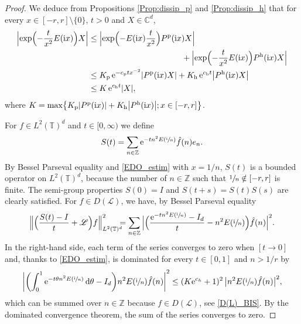 \documentclass[10pt]{amsart}
\let\mathcal\mathscr
\theoremstyle{plain}
\theoremstyle{definition}
\theoremstyle{remark}
\newcommand{\diff}[1][-3]{\ensuremath{\mathop{}\mkern#1mu\mathrm{d}}}
\newcommand{\set}{\mathbb}
\newcommand{\Z}{\set{Z}}
\renewcommand{\C}{\set{C}}
\newcommand{\T}{\set{T}}
\newcommand{\h}{{\mathrm h}}
\newcommand{\p}{{\mathrm p}}
\newcommand{\eu}{\mathrm e}
\newcommand{\iu}{\mathrm i}
\let\originalleft\left
\let\originalright\right
\renewcommand{\left}{\mathopen{}\mathclose\bgroup\originalleft}
\renewcommand{\right}{\aftergroup\egroup\originalright}
\begin{document}
\begin{proof}
We deduce from Propositions \ref{Prop:dissip_p} and \ref{Prop:dissip_h} that for every $x \in [-r,r]\setminus\{0\}$, $t> 0$ and $X \in \C^d$,
\begin{equation} \label{EDO_estim}
\begin{aligned}
\Bigl\lvert \exp\Bigl(-\frac{t}{x^2} E(\iu x) \Bigr) X \Bigl\rvert
& \leq
\Bigl\lvert \exp\Bigl(- E(\iu x) \frac{t}{x^2} \Bigr) P^\p(\iu x) X \Bigr\rvert\\
&\hspace*{4cm} +
\Bigl\lvert \exp\Bigl(- \frac{t}{x^2} E(\iu x) \Bigr) P^\h(\iu x) X \Bigr\rvert
\\ & \leq
K_\p\, \eu^{-c_\p tx^{-2}} \left\lvert P^\p(\iu x) X \right\rvert
+
K_\h\, \eu^{c_\h t} \left\lvert P^\h(\iu x) X \right\rvert
\\ & \leq
K\, \eu^{c_\h t} \left\lvert X \right\rvert,
\end{aligned}
\end{equation}
where $K=\max\left\{ K_\p \left\lvert P^\p(\iu x) \right\rvert
+ K_\h \left\lvert P^\h(\iu x) \right\rvert ; x \in [-r,r] \right\}$.

For $f \in L^2(\T)^d$ and $t\in[0,\infty)$ we define
\[
S(t)=\sum_{n\in\Z} \eu^{-tn^2 E\left(\sfrac{\iu}{n} \right)} \hat{f}(n) e_n.
\]
By Bessel Parseval equality and \eqref{EDO_estim} with $x=1/n$, $S(t)$ is a bounded operator on $L^2(\T)^d$, because the number of $n\in\Z$ such that $\sfrac{1}{n} \notin [-r,r]$ is finite.
The semi-group properties $S(0)=I$ and $S(t+s)=S(t) S(s)$ are clearly satisfied. For $f\in D(\mathcal{L})$, we have, by Bessel Parseval equality
\[
\Bigl\lVert \Bigl(\frac{S(t)-I}{t} + \mathcal{L} \Bigr)f \Bigr\rVert_{L^2(\T)^d}^2\mkern-12mu
=
\sum_{n\in\Z}\, \Bigl\lvert \Bigl(\dfrac{\eu^{-tn^2 E\left(\sfrac{\iu}{n} \right)}-I_d}{t} - n^2 E\left(\sfrac{\iu}{n}\right) \Bigr) \hat{f}(n)\Bigr\rvert^2.
\]
In the right-hand side, each term of the series converges to zero when $[t \to 0]$ and, thanks to \eqref{EDO_estim}, is dominated for every $t \in [0,1]$ and $n>1/r$ by
\[
\left\lvert
\left(\int_0^1 \eu^{-t\theta n^2 E\left(\sfrac{\iu}{n} \right)} \diff\theta - I_d \right) n^2 E\left(\sfrac{\iu}{n}\right) \hat{f}(n)\right\rvert^2 \leq (K \eu^{c_h} + 1)^2\,\bigl\lvert n^2 E\left(\sfrac{\iu}{n}\right) \hat{f}(n)\bigr\rvert^2,
\]
which can be summed over $n\in\Z$ because $f\in D(\mathcal{L})$, see \eqref{D(L)_BIS}.
By the dominated convergence theorem, the sum of the series converges to zero.
\end{proof}
\end{document}
